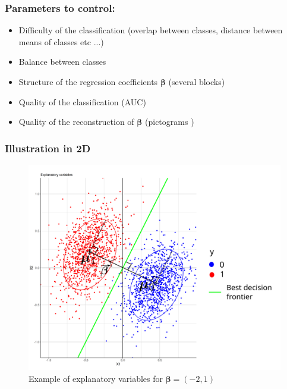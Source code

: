 \documentclass{beamer}
\begin{document}
\begin{frame}
    \frametitle{Parameters to control:}
    \begin{itemize}
        \item Difficulty of the classification (overlap between classes, distance between means of classes etc ...)\\[12 pt]
        \item Balance between classes\\[12 pt]
        \item Structure of the regression coefficients $\bm{\beta}$ (several blocks)\\[12 pt] 
        \item Quality of the classification (AUC)\\[12 pt]
        \item Quality of the reconstruction of $\bm{\beta}$ (pictograms \cite{picto})
    \end{itemize}
\end{frame}

\begin{frame}
    \frametitle{Illustration in 2D}

    \begin{figure}
        \centering
        \includegraphics[scale = 0.2]{images/2D_better.png}
        \caption{Example of explanatory variables for $\bm{\beta} = (-2,1)$}
    \end{figure}
\end{frame}
\end{document}
